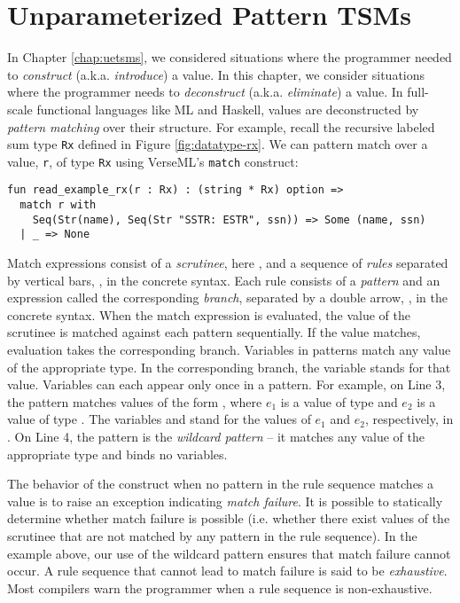 \chapter{Unparameterized Pattern TSMs}\label{chap:uptsms}
In Chapter \ref{chap:uetsms}, we considered situations where the programmer needed to \emph{construct} (a.k.a. \emph{introduce}) a value. In this chapter, we consider situations where the programmer needs to \emph{deconstruct} (a.k.a. \emph{eliminate}) a value. In full-scale functional languages like ML and Haskell, values are deconstructed by \emph{pattern matching} over their structure. For example, recall the recursive labeled sum type \lstinline{Rx} defined in Figure \ref{fig:datatype-rx}. We can pattern match over a value, \lstinline{r}, of type \lstinline{Rx} using VerseML's \lstinline{match} construct:
\begin{lstlisting}
fun read_example_rx(r : Rx) : (string * Rx) option => 
  match r with 
    Seq(Str(name), Seq(Str "SSTR: ESTR", ssn)) => Some (name, ssn)
  | _ => None
\end{lstlisting}

Match expressions consist of a \emph{scrutinee}, here , and a sequence of \emph{rules} separated by vertical bars, \li{|}, in the concrete syntax. Each rule consists of a \emph{pattern} and an {expression} called the corresponding \emph{branch}, separated by a double arrow, \li{=>}, in the concrete syntax. When the {match} expression is evaluated, the value of the scrutinee is matched against each pattern sequentially. If the value matches, evaluation takes the corresponding branch. Variables in patterns match any value of the appropriate type. In the corresponding branch, the variable stands for that value. Variables can each appear only once in a pattern.  
For example, on Line 3, the pattern  matches values of the form , where $e_1$ is a value of type  and $e_2$ is a value of type . The variables  and  stand for the values of $e_1$ and $e_2$, respectively, in . On Line 4, the pattern \li{_} is the \emph{wildcard pattern} -- it matches any value of the appropriate type and binds no variables.

The behavior of the  construct when no pattern in the rule sequence matches a value is to raise an exception indicating \emph{match failure}. It is possible to statically determine whether match failure is possible (i.e. whether there exist values of the scrutinee that are not matched by any pattern in the rule sequence). In the example above, our use of the wildcard pattern ensures that match failure cannot occur. A rule sequence that cannot lead to match failure is said to be \emph{exhaustive}. Most compilers warn the programmer when a rule sequence is non-exhaustive.

